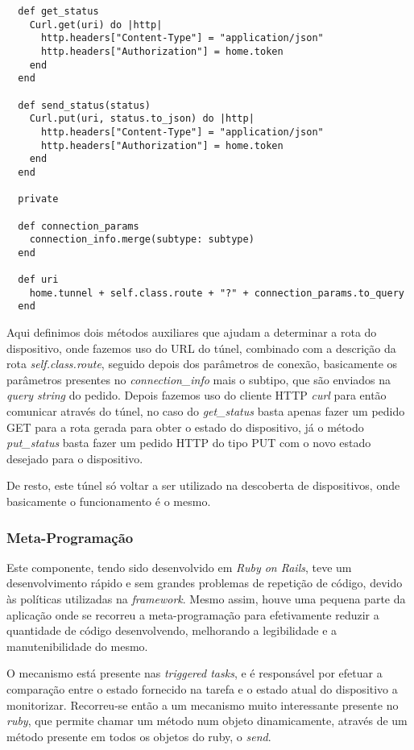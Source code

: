 \begin{verbatim}
  def get_status
    Curl.get(uri) do |http|
      http.headers["Content-Type"] = "application/json"
      http.headers["Authorization"] = home.token
    end
  end
  
  def send_status(status)
    Curl.put(uri, status.to_json) do |http|
      http.headers["Content-Type"] = "application/json"
      http.headers["Authorization"] = home.token
    end
  end
  
  private
  
  def connection_params
    connection_info.merge(subtype: subtype)
  end

  def uri
    home.tunnel + self.class.route + "?" + connection_params.to_query
  end
\end{verbatim}

Aqui definimos dois métodos auxiliares que ajudam a determinar a rota do dispositivo, onde fazemos uso do URL do túnel, combinado com a descrição da rota \textit{self.class.route}, seguido depois dos parâmetros de conexão, basicamente os parâmetros presentes no \textit{connection\_info} mais o subtipo, que são enviados na \textit{query string} do pedido. Depois fazemos uso do cliente HTTP \textit{curl} para então comunicar através do túnel, no caso do \textit{get\_status} basta apenas fazer um pedido GET para a rota gerada para obter o estado do dispositivo, já o método \textit{put\_status} basta fazer um pedido HTTP do tipo PUT com o novo estado desejado para o dispositivo. 

De resto, este túnel só voltar a ser utilizado na descoberta de dispositivos, onde basicamente o funcionamento é o mesmo.

\subsubsection{Meta-Programação}

Este componente, tendo sido desenvolvido em \textit{Ruby on Rails}, teve um desenvolvimento rápido e sem grandes problemas de repetição de código, devido às políticas utilizadas na \textit{framework}. Mesmo assim, houve uma pequena parte da aplicação onde se recorreu a meta-programação para efetivamente reduzir a quantidade de código desenvolvendo, melhorando a legibilidade e a manutenibilidade do mesmo.

O mecanismo está presente nas \textit{triggered tasks}, e é responsável por efetuar a comparação entre o estado fornecido na tarefa e o estado atual do dispositivo a monitorizar. Recorreu-se então a um mecanismo muito interessante presente no \textit{ruby}, que permite chamar um método num objeto dinamicamente, através de um método presente em todos os objetos do ruby, o \textit{send}.

